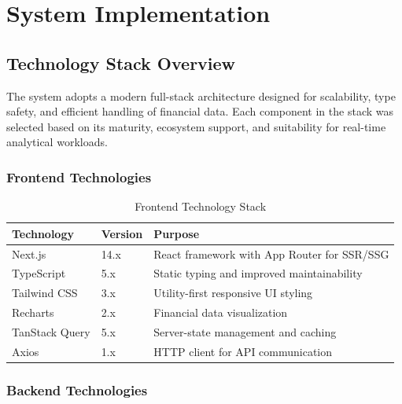 \chapter{System Implementation}

\section{Technology Stack Overview}

The system adopts a modern full-stack architecture designed for scalability, type safety, and efficient handling of financial data. Each component in the stack was selected based on its maturity, ecosystem support, and suitability for real-time analytical workloads.

\subsection{Frontend Technologies}

\begin{table}[H]
\centering
\begin{tabular}{lll}
\toprule
\textbf{Technology} & \textbf{Version} & \textbf{Purpose} \\
\midrule
Next.js & 14.x & React framework with App Router for SSR/SSG \\
TypeScript & 5.x & Static typing and improved maintainability \\
Tailwind CSS & 3.x & Utility-first responsive UI styling \\
Recharts & 2.x & Financial data visualization \\
TanStack Query & 5.x & Server-state management and caching \\
Axios & 1.x & HTTP client for API communication \\
\bottomrule
\end{tabular}
\caption{Frontend Technology Stack}
\label{tab:frontend_stack}
\end{table}

\subsection{Backend Technologies}

